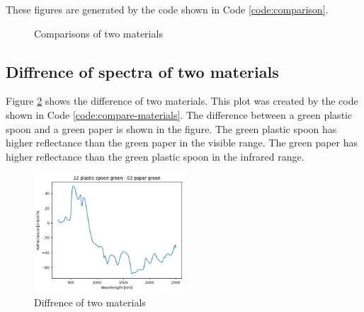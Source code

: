 These figures are generated by the code shown in Code \ref{code:comparison}.

\begin{figure}[H] %
  \centering
  \vspace{0.1cm}
  \caption[]{Comparisons of two materials}
  \label{fig:2mat}
\end{figure}

\subsection{Diffrence of spectra of two materials}
Figure \ref{fig:diff2mat} shows the difference of two materials. This plot was created by the code shown in Code \ref{code:compare-materials}. The difference between a green plastic spoon and a green paper is shown in the figure. The green plastic spoon has higher reflectance than the green paper in the visible range. The green paper has higher reflectance than the green plastic spoon in the infrared range.

\begin{figure}[H]
  \centering
  \caption{Diffrence of two materials}
  \label{fig:diff2mat}
  \includegraphics[width=0.5\textwidth]{./figs-task2/2spec-diff.png}
\end{figure}

